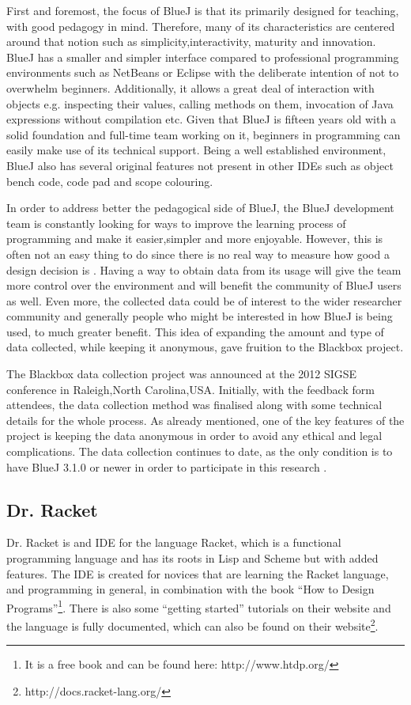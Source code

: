 First and foremost, the focus of BlueJ is that its primarily designed for teaching, with good pedagogy in mind. Therefore, many of its characteristics are centered around that notion such as simplicity,interactivity, maturity and innovation. BlueJ has a smaller and simpler interface compared to professional programming environments such as NetBeans or Eclipse with the deliberate intention of not to overwhelm beginners. Additionally, it allows a great deal of interaction with objects e.g. inspecting their values, calling methods on them, invocation of Java expressions without compilation etc. Given that BlueJ is fifteen years old with a solid foundation and full-time team working on it, beginners in programming can easily make use of its technical support. Being a well established environment, BlueJ also has several original features not present in other IDEs such as object bench code, code pad and scope colouring.	

In order to address better the pedagogical side of BlueJ, the BlueJ development team is constantly looking for ways to improve the learning process of programming and make it easier,simpler and more enjoyable. However, this is often not an easy thing to do since there is no real way to measure how good a design decision is \cite{bluej_blackbox}. Having a way to obtain data from its usage will give the team more control over the environment and will benefit the community of BlueJ users as well. Even more, the collected data could be of interest to the wider researcher community and generally people who might be interested in how BlueJ is being used, to much greater benefit. This idea of expanding the amount and type of data collected, while keeping it anonymous, gave fruition to the Blackbox project.

The Blackbox data collection project was announced at the 2012 SIGSE conference in Raleigh,North Carolina,USA.\cite{bluej_blackbox} Initially, with the feedback form attendees, the data collection method was finalised along with some technical details for the whole process. As already mentioned, one of the key features of the project is keeping the data anonymous in order to avoid any ethical and legal complications. The data collection continues to date, as the only condition is to have BlueJ 3.1.0 or newer in order to participate in this research \cite{bluej_blackbox2}.

\subsection{Dr. Racket}
Dr. Racket is and IDE for the language Racket, which is a functional programming language and has its roots in Lisp and Scheme but with added features. The IDE is created for novices that are learning the Racket language, and programming in general, in combination with the book ``How to Design Programs''\footnote{It is a free book and can be found here: http://www.htdp.org/}. There is also some ``getting started'' tutorials on their website and the language is fully documented, which can also be found on their website\footnote{http://docs.racket-lang.org/}.

